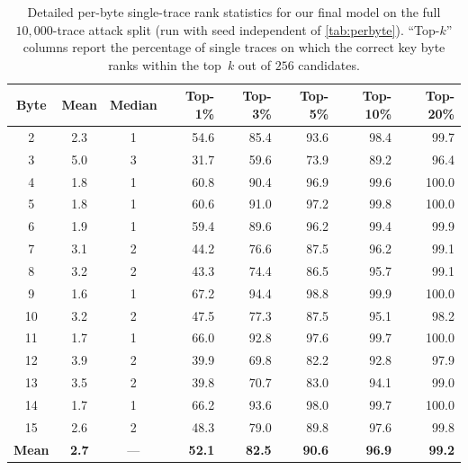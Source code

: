 \documentclass[runningheads]{llncs}
\begin{document}
\begin{table}[t]
  \centering
  \caption{Detailed per-byte single-trace rank statistics for our final model on the full $10{,}000$-trace attack split (run with seed independent of \cref{tab:perbyte}).
  ``Top-$k$'' columns report the percentage of single traces on which the correct key byte ranks within the top~$k$ out of $256$ candidates.}
  \label{tab:perbyte_detail}
  \scriptsize
  \setlength{\tabcolsep}{4pt}
  \begin{tabular}{@{}cccrrrrr@{}}
    \toprule
    \textbf{Byte} & \textbf{Mean} & \textbf{Median} & \textbf{Top-1\%} & \textbf{Top-3\%} & \textbf{Top-5\%} & \textbf{Top-10\%} & \textbf{Top-20\%} \\
    \midrule
    2  & 2.3 & 1 & 54.6 & 85.4 & 93.6 & 98.4 & 99.7  \\
    3  & 5.0 & 3 & 31.7 & 59.6 & 73.9 & 89.2 & 96.4  \\
    4  & 1.8 & 1 & 60.8 & 90.4 & 96.9 & 99.6 & 100.0 \\
    5  & 1.8 & 1 & 60.6 & 91.0 & 97.2 & 99.8 & 100.0 \\
    6  & 1.9 & 1 & 59.4 & 89.6 & 96.2 & 99.4 & 99.9  \\
    7  & 3.1 & 2 & 44.2 & 76.6 & 87.5 & 96.2 & 99.1  \\
    8  & 3.2 & 2 & 43.3 & 74.4 & 86.5 & 95.7 & 99.1  \\
    9  & 1.6 & 1 & 67.2 & 94.4 & 98.8 & 99.9 & 100.0 \\
    10 & 3.2 & 2 & 47.5 & 77.3 & 87.5 & 95.1 & 98.2  \\
    11 & 1.7 & 1 & 66.0 & 92.8 & 97.6 & 99.7 & 100.0 \\
    12 & 3.9 & 2 & 39.9 & 69.8 & 82.2 & 92.8 & 97.9  \\
    13 & 3.5 & 2 & 39.8 & 70.7 & 83.0 & 94.1 & 99.0  \\
    14 & 1.7 & 1 & 66.2 & 93.6 & 98.0 & 99.7 & 100.0 \\
    15 & 2.6 & 2 & 48.3 & 79.0 & 89.8 & 97.6 & 99.8  \\
    \midrule
    \textbf{Mean} & \textbf{2.7} & --- & \textbf{52.1} & \textbf{82.5} & \textbf{90.6} & \textbf{96.9} & \textbf{99.2} \\
    \bottomrule
  \end{tabular}
\end{table}
\end{document}
